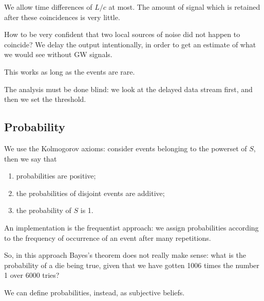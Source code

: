 \documentclass[main.tex]{subfiles}
\begin{document}
We allow time differences of \(L/c\) at most. 
The amount of signal which is retained after these coincidences is very little. 

How to be very confident that two local sources of noise did not happen to coincide?
We delay the output intentionally, in order to get an estimate of what we would see without GW signals. 

This works as long as the events are rare. 

The analysis must be done blind: we look at the delayed data stream first, and then we set the threshold. 


\subsection{Probability}

We use the Kolmogorov axioms: consider events belonging to the powerset of \(S\), then we say that 
\begin{enumerate}
    \item probabilities are positive;
    \item the probabilities of disjoint events are additive;
    \item the probability of \(S\) is 1.
\end{enumerate}

An implementation is the frequentist approach: we assign probabilities according to the frequency of occurrence of an event after many repetitions. 

So, in this approach Bayes's theorem does not really make sense: what is the probability of a die being true, given that we have gotten 1006 times the number 1 over 6000 tries?

We can define probabilities, instead, as subjective beliefs. 
\end{document}
